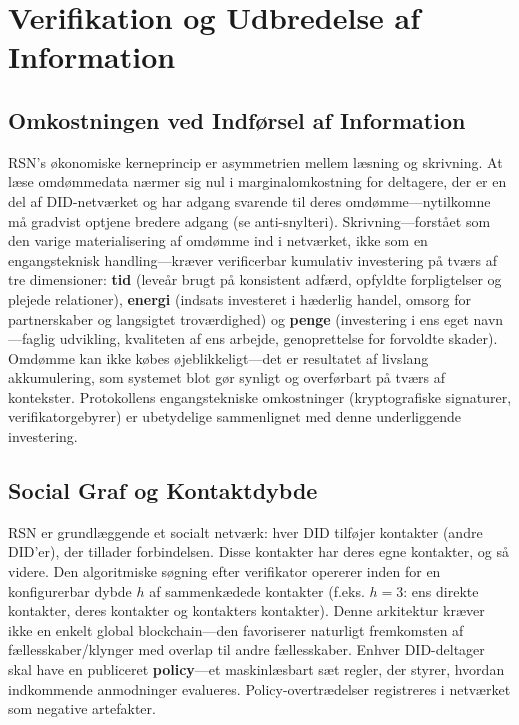 \documentclass[11pt,a4paper,twocolumn]{article}
\begin{document}
\section{Verifikation og Udbredelse af Information}

\subsection{Omkostningen ved Indførsel af Information}

RSN's økonomiske kerneprincip er asymmetrien mellem læsning og skrivning. At læse omdømmedata nærmer sig nul i marginalomkostning for deltagere, der er en del af DID-netværket og har adgang svarende til deres omdømme---nytilkomne må gradvist optjene bredere adgang (se anti-snylteri). Skrivning---forstået som den varige materialisering af omdømme ind i netværket, ikke som en engangsteknisk handling---kræver verificerbar kumulativ investering på tværs af tre dimensioner: \textbf{tid} (leveår brugt på konsistent adfærd, opfyldte forpligtelser og plejede relationer), \textbf{energi} (indsats investeret i hæderlig handel, omsorg for partnerskaber og langsigtet troværdighed) og \textbf{penge} (investering i ens eget navn---faglig udvikling, kvaliteten af ens arbejde, genoprettelse for forvoldte skader). Omdømme kan ikke købes øjeblikkeligt---det er resultatet af livslang akkumulering, som systemet blot gør synligt og overførbart på tværs af kontekster. Protokollens engangstekniske omkostninger (kryptografiske signaturer, verifikatorgebyrer) er ubetydelige sammenlignet med denne underliggende investering.

\subsection{Social Graf og Kontaktdybde}

RSN er grundlæggende et socialt netværk: hver DID tilføjer kontakter (andre DID'er), der tillader forbindelsen. Disse kontakter har deres egne kontakter, og så videre. Den algoritmiske søgning efter verifikator opererer inden for en konfigurerbar dybde $h$ af sammenkædede kontakter (f.eks. $h=3$: ens direkte kontakter, deres kontakter og kontakters kontakter). Denne arkitektur kræver ikke en enkelt global blockchain---den favoriserer naturligt fremkomsten af fællesskaber/klynger med overlap til andre fællesskaber. Enhver DID-deltager skal have en publiceret \textbf{policy}---et maskinlæsbart sæt regler, der styrer, hvordan indkommende anmodninger evalueres. Policy-overtrædelser registreres i netværket som negative artefakter.
\end{document}
